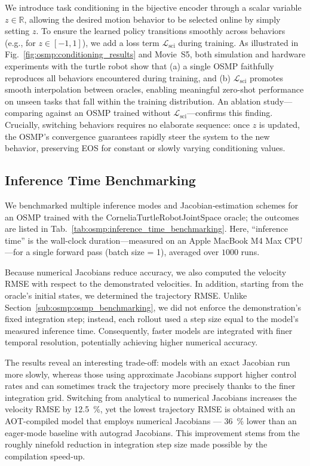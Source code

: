 We introduce task conditioning in the bijective encoder through a scalar variable $z \in \mathbb{R}$, allowing the desired motion behavior to be selected online by simply setting $z$. To ensure the learned policy transitions smoothly across behaviors (e.g., for $z \in [-1, 1]$), we add a loss term $\mathcal{L}_\mathrm{sci}$ during training. As illustrated in Fig.~\ref{fig:osmp:conditioning_results} and Movie~S5, both simulation and hardware experiments with the turtle robot show that (a) a single \gls{OSMP} faithfully reproduces all behaviors encountered during training, and (b) $\mathcal{L}_\mathrm{sci}$ promotes smooth interpolation between oracles, enabling meaningful zero-shot performance on unseen tasks that fall within the training distribution. An ablation study—comparing against an \gls{OSMP} trained without $\mathcal{L}_\mathrm{sci}$—confirms this finding. Crucially, switching behaviors requires no elaborate sequence: once $z$ is updated, the \gls{OSMP}’s convergence guarantees rapidly steer the system to the new behavior, preserving EOS for constant or slowly varying conditioning values.

\subsection{Inference Time Benchmarking}\label{sub:osmp:inference_time_benchmarking}
We benchmarked multiple inference modes and Jacobian‐estimation schemes for an \gls{OSMP} trained with the CorneliaTurtleRobotJointSpace oracle; the outcomes are listed in Tab.~\ref{tab:osmp:inference_time_benchmarking}. Here, “inference time” is the wall-clock duration—measured on an Apple MacBook M4 Max CPU—for a single forward pass (batch size = 1), averaged over $1000$ runs.

Because numerical Jacobians reduce accuracy, we also computed the velocity RMSE with respect to the demonstrated velocities. In addition, starting from the oracle’s initial states, we determined the trajectory RMSE. Unlike Section~\ref{sub:osmp:osmp_benchmarking}, we did not enforce the demonstration’s fixed integration step; instead, each rollout used a step size equal to the model’s measured inference time. Consequently, faster models are integrated with finer temporal resolution, potentially achieving higher numerical accuracy.

The results reveal an interesting trade-off: models with an exact Jacobian run more slowly, whereas those using approximate Jacobians support higher control rates and can sometimes track the trajectory more precisely thanks to the finer integration grid. Switching from analytical to numerical Jacobians increases the velocity RMSE by \SI{12.5}{\percent}, yet the lowest trajectory \gls{RMSE} is obtained with an \gls{AOT}-compiled model that employs numerical Jacobians — \SI{36}{\percent} lower than an eager-mode baseline with autograd Jacobians. This improvement stems from the roughly ninefold reduction in integration step size made possible by the compilation speed-up.

